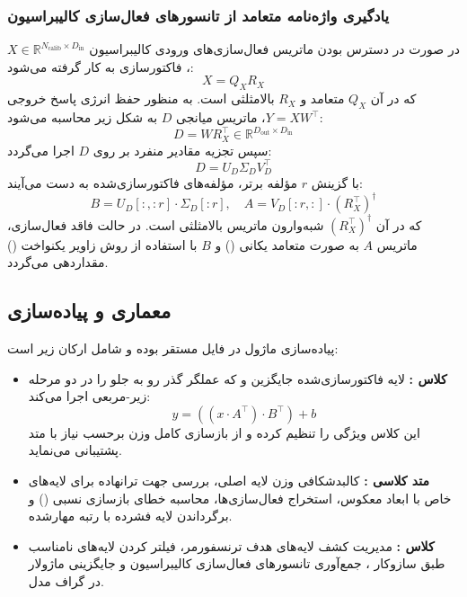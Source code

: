 \subsubsection*{یادگیری واژه‌نامه متعامد از تانسورهای فعال‌سازی کالیبراسیون}
در صورت در دسترس بودن ماتریس فعال‌سازی‌های ورودی کالیبراسیون $X \in \mathbb{R}^{N_{\text{calib}} \times D_{\text{in}}}$، فاکتورسازی  به کار گرفته می‌شود:
\begin{equation}
X = Q_X R_X
\end{equation}
که در آن $Q_X$ متعامد و $R_X$ بالا‌مثلثی است. به منظور حفظ انرژی پاسخ خروجی $Y = X W^\top$، ماتریس میانجی $D$ به شکل زیر محاسبه می‌شود:
\begin{equation}
D = W R_X^\top \in \mathbb{R}^{D_{\text{out}} \times D_{\text{in}}}
\end{equation}
سپس تجزیه مقادیر منفرد بر روی $D$ اجرا می‌گردد:
\begin{equation}
D = U_D \Sigma_D V_D^\top
\end{equation}
با گزینش $r$ مؤلفه برتر، مؤلفه‌های فاکتورسازی‌شده به دست می‌آیند:
\begin{equation}
B = U_D[:, :r] \cdot \Sigma_D[:r], \quad A = V_D[:r, :] \cdot (R_X^\top)^\dagger
\end{equation}
که در آن $(R_X^\top)^\dagger$ شبه‌وارون ماتریس بالامثلثی است. در حالت فاقد فعال‌سازی، ماتریس $A$ به صورت متعامد یکانی () و $B$ با استفاده از روش زاویر یکنواخت () مقداردهی می‌گردد.

\subsection{معماری و پیاده‌سازی}
پیاده‌سازی ماژول در فایل  مستقر بوده و شامل ارکان زیر است:
\begin{itemize}
    \item \textbf{کلاس :} لایه فاکتورسازی‌شده جایگزین  و  که عملگر گذر رو به جلو را در دو مرحله زیر-مربعی اجرا می‌کند:
    \begin{equation}
    y = ((x \cdot A^\top) \cdot B^\top) + b
    \end{equation}
    این کلاس ویژگی  را تنظیم کرده و از بازسازی کامل وزن برحسب نیاز با متد  پشتیبانی می‌نماید.
    \item \textbf{متد کلاسی :} کالبدشکافی وزن لایه اصلی، بررسی جهت ترانهاده برای لایه‌های خاص  با ابعاد معکوس، استخراج فعال‌سازی‌ها، محاسبه خطای بازسازی نسبی () و برگرداندن لایه فشرده با رتبه مهارشده.
    \item \textbf{کلاس :} مدیریت کشف لایه‌های هدف ترنسفورمر، فیلتر کردن لایه‌های نامناسب طبق سازوکار ، جمع‌آوری تانسورهای فعال‌سازی کالیبراسیون و جایگزینی ماژولار در گراف مدل.
\end{itemize}

